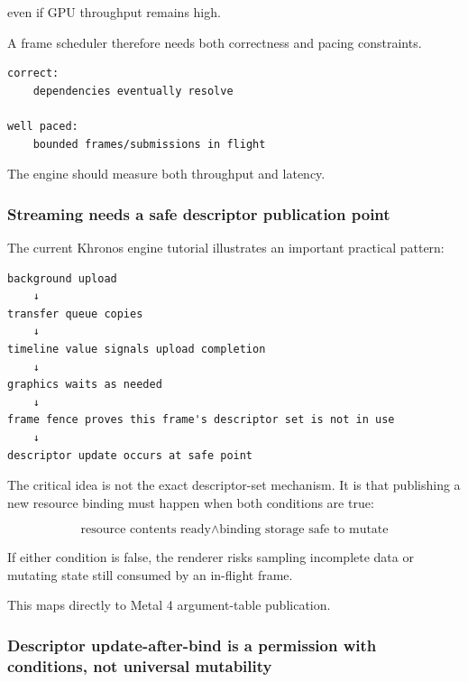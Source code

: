 even if GPU throughput remains high.

A frame scheduler therefore needs both correctness and pacing constraints.

\begin{verbatim}
correct:
    dependencies eventually resolve

well paced:
    bounded frames/submissions in flight
\end{verbatim}

The engine should measure both throughput and latency.

\subsubsection{Streaming needs a safe descriptor publication point}\label{05-engine-i-ch023-streaming-needs-a-safe-descriptor-publication-point}

\hypertarget{05-engine-i-ch023-streaming-needs-a-safe-descriptor-publication-point}{}

The current Khronos engine tutorial illustrates an important practical pattern:

\begin{verbatim}
background upload
    ↓
transfer queue copies
    ↓
timeline value signals upload completion
    ↓
graphics waits as needed
    ↓
frame fence proves this frame's descriptor set is not in use
    ↓
descriptor update occurs at safe point
\end{verbatim}

The critical idea is not the exact descriptor-set mechanism. It is that publishing a new resource binding must happen when both conditions are true:

\[
\boxed{
\text{resource contents ready}
\land
\text{binding storage safe to mutate}
}
\]

If either condition is false, the renderer risks sampling incomplete data or mutating state still consumed by an in-flight frame.

This maps directly to Metal 4 argument-table publication.

\subsubsection{Descriptor update-after-bind is a permission with conditions, not universal mutability}\label{05-engine-i-ch023-descriptor-update-after-bind-is-a-permission-with-conditions-not-universal-mutability}

\hypertarget{05-engine-i-ch023-descriptor-update-after-bind-is-a-permission-with-conditions-not-universal-mutability}{}


